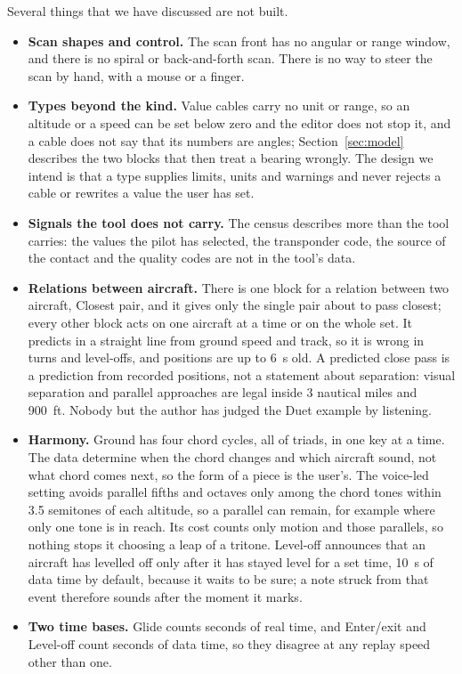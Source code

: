 \documentclass[11pt,letterpaper]{article}
\begin{document}
Several things that we have discussed are not built.
\begin{itemize}
\item \textbf{Scan shapes and control.} The scan front has no angular or range window, and there is no spiral or back-and-forth scan. There is no way to steer the scan by hand, with a mouse or a finger.
\item \textbf{Types beyond the kind.} Value cables carry no unit or range, so an altitude or a speed can be set below zero and the editor does not stop it, and a cable does not say that its numbers are angles; Section~\ref{sec:model} describes the two blocks that then treat a bearing wrongly. The design we intend is that a type supplies limits, units and warnings and never rejects a cable or rewrites a value the user has set.
\item \textbf{Signals the tool does not carry.} The census describes more than the tool carries: the values the pilot has selected, the transponder code, the source of the contact and the quality codes are not in the tool's data.
\item \textbf{Relations between aircraft.} There is one block for a relation between two aircraft, Closest pair, and it gives only the single pair about to pass closest; every other block acts on one aircraft at a time or on the whole set. It predicts in a straight line from ground speed and track, so it is wrong in turns and level-offs, and positions are up to 6~s old. A predicted close pass is a prediction from recorded positions, not a statement about separation: visual separation and parallel approaches are legal inside 3 nautical miles and 900~ft. Nobody but the author has judged the Duet example by listening.
\item \textbf{Harmony.} Ground has four chord cycles, all of triads, in one key at a time. The data determine when the chord changes and which aircraft sound, not what chord comes next, so the form of a piece is the user's. The voice-led setting avoids parallel fifths and octaves only among the chord tones within 3.5 semitones of each altitude, so a parallel can remain, for example where only one tone is in reach. Its cost counts only motion and those parallels, so nothing stops it choosing a leap of a tritone. Level-off announces that an aircraft has levelled off only after it has stayed level for a set time, 10~s of data time by default, because it waits to be sure; a note struck from that event therefore sounds after the moment it marks.
\item \textbf{Two time bases.} Glide counts seconds of real time, and Enter/exit and Level-off count seconds of data time, so they disagree at any replay speed other than one.

\end{itemize}
\end{document}

